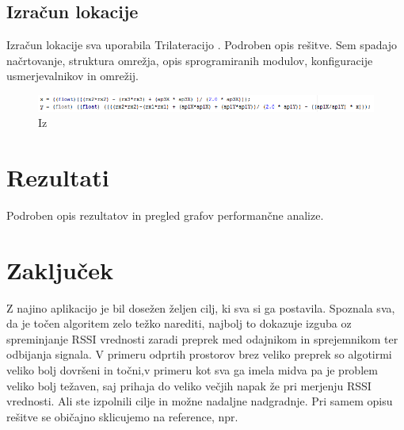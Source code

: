 \documentclass[11pt,a4paper,slovene]{article}
\begin{document}
\subsection{Izračun lokacije}
Izračun lokacije sva uporabila Trilateracijo \cite{trilateration}.
Podroben opis rešitve. Sem spadajo načrtovanje, struktura omrežja, opis sprogramiranih modulov, konfiguracije usmerjevalnikov in omrežij.

\begin{figure}[htb]
\centering
\includegraphics[scale=0.8]{slike/trilinerationCalculation.png}
\caption{Iz}
\end{figure}

\section{Rezultati}
Podroben opis rezultatov in pregled grafov performančne analize.

\section{Zaključek}
Z najino aplikacijo je bil dosežen željen cilj, ki sva si ga postavila. Spoznala sva, da je točen algoritem zelo težko narediti, najbolj to dokazuje izguba oz spreminjanje RSSI vrednosti zaradi preprek med odajnikom in sprejemnikom ter odbijanja signala. V primeru odprtih prostorov brez veliko preprek so algotirmi veliko bolj dovršeni in točni,v primeru kot sva ga imela midva pa je problem veliko bolj težaven, saj prihaja do veliko večjih napak že pri merjenju RSSI vrednosti.
Ali ste izpolnili cilje in možne nadaljne nadgradnje. Pri samem opisu rešitve se običajno sklicujemo na reference, npr.

\pagebreak


\end{document}
